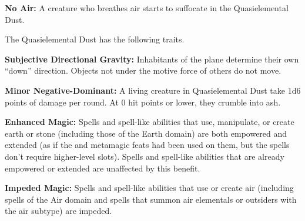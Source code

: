\textbf{No Air:} A creature who breathes air starts to suffocate in the Quasielemental Dust.

The Quasielemental Dust has the following traits.
\begin{itemize*}
\item \textbf{Subjective Directional Gravity:} Inhabitants of the plane determine their own ``down'' direction. Objects not under the motive force of others do not move.
\item \textbf{Minor Negative-Dominant:} A living creature in Quasielemental Dust take 1d6 points of damage per round. At 0 hit points or lower, they crumble into ash.
\item \textbf{Enhanced Magic:} Spells and spell-like abilities that use, manipulate, or create earth or stone (including those of the Earth domain) are both empowered and extended (as if the  and  metamagic feats had been used on them, but the spells don't require higher-level slots). Spells and spell-like abilities that are already empowered or extended are unaffected by this benefit.
\item \textbf{Impeded Magic:} Spells and spell-like abilities that use or create air (including spells of the Air domain and spells that summon air elementals or outsiders with the air subtype) are impeded.
\end{itemize*}
